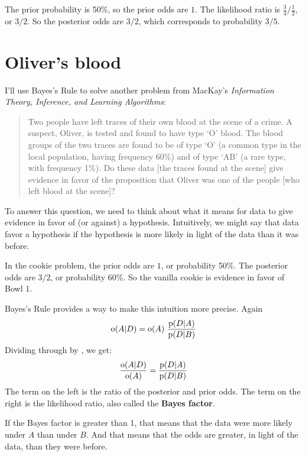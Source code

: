 \documentclass[12pt]{book}
\theoremstyle{exercise}
\begin{document}
The prior probability is 50\%, so the prior odds are $1$.
The likelihood ratio is $\frac{3}{4} / \frac{1}{2}$, or $3/2$.
So the posterior odds are $3/2$, which corresponds to probability
$3/5$.


\section{Oliver's blood}
\label{oliver}


I'll use Bayes's Rule to solve another problem from MacKay's {\it Information Theory, Inference, and Learning Algorithms}:

\begin{quote}
Two people have left traces of their own blood at the scene of
a crime.  A suspect, Oliver, is tested and found to have type
`O' blood.  The blood groups of the two traces are found to
be of type `O' (a common type in the local population, having frequency
60\%) and of type `AB' (a rare type, with frequency 1\%).
Do these data [the traces found at the scene] give evidence
in favor of the proposition that Oliver was one of the people
[who left blood at the scene]?
\end{quote}

To answer this question, we need to think about what it means
for data to give evidence in favor of (or against) a hypothesis.
Intuitively, we might say that data favor a hypothesis if the
hypothesis is more likely in light of the data than it was before.


In the cookie problem, the prior odds are $1$, or probability 50\%.
The posterior odds are $3/2$, or probability 60\%.
So the vanilla cookie is evidence in favor of Bowl 1.

Bayes's Rule provides a way to make this intuition more precise.  Again
%
\[ \mathrm{o}(A|D) = \mathrm{o}(A)~\frac{\mathrm{p}(D|A)}{\mathrm{p}(D|B)} \]
%
Dividing through by , we get:
%
\[ \frac{\mathrm{o}(A|D)}{\mathrm{o}(A)} = \frac{\mathrm{p}(D|A)}{\mathrm{p}(D|B)} \]
%
The term on the left is the ratio of the posterior and prior odds.
The term on the right is the likelihood ratio, also called the {\bf Bayes
factor}.


If the Bayes factor is greater than 1, that means that the
data were more likely under $A$ than under $B$.
And that means that the odds are greater, in light of the data, than they were before.
\end{document}
